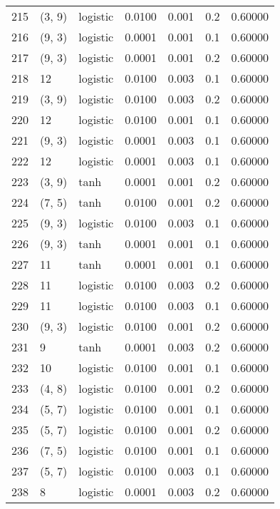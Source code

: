 \begin{tabular}{lllrrrr}
215 &      (3, 9) &  logistic &  0.0100 &  0.001 &  0.2 &   0.60000 \\
216 &      (9, 3) &  logistic &  0.0001 &  0.001 &  0.1 &   0.60000 \\
217 &      (9, 3) &  logistic &  0.0001 &  0.001 &  0.2 &   0.60000 \\
218 &          12 &  logistic &  0.0100 &  0.003 &  0.1 &   0.60000 \\
219 &      (3, 9) &  logistic &  0.0100 &  0.003 &  0.2 &   0.60000 \\
220 &          12 &  logistic &  0.0100 &  0.001 &  0.1 &   0.60000 \\
221 &      (9, 3) &  logistic &  0.0001 &  0.003 &  0.1 &   0.60000 \\
222 &          12 &  logistic &  0.0001 &  0.003 &  0.1 &   0.60000 \\
223 &      (3, 9) &      tanh &  0.0001 &  0.001 &  0.2 &   0.60000 \\
224 &      (7, 5) &      tanh &  0.0100 &  0.001 &  0.2 &   0.60000 \\
225 &      (9, 3) &  logistic &  0.0100 &  0.003 &  0.1 &   0.60000 \\
226 &      (9, 3) &      tanh &  0.0001 &  0.001 &  0.1 &   0.60000 \\
227 &          11 &      tanh &  0.0001 &  0.001 &  0.1 &   0.60000 \\
228 &          11 &  logistic &  0.0100 &  0.003 &  0.2 &   0.60000 \\
229 &          11 &  logistic &  0.0100 &  0.003 &  0.1 &   0.60000 \\
230 &      (9, 3) &  logistic &  0.0100 &  0.001 &  0.2 &   0.60000 \\
231 &           9 &      tanh &  0.0001 &  0.003 &  0.2 &   0.60000 \\
232 &          10 &  logistic &  0.0100 &  0.001 &  0.1 &   0.60000 \\
233 &      (4, 8) &  logistic &  0.0100 &  0.001 &  0.2 &   0.60000 \\
234 &      (5, 7) &  logistic &  0.0100 &  0.001 &  0.1 &   0.60000 \\
235 &      (5, 7) &  logistic &  0.0100 &  0.001 &  0.2 &   0.60000 \\
236 &      (7, 5) &  logistic &  0.0100 &  0.001 &  0.1 &   0.60000 \\
237 &      (5, 7) &  logistic &  0.0100 &  0.003 &  0.1 &   0.60000 \\
238 &           8 &  logistic &  0.0001 &  0.003 &  0.2 &   0.60000 \\

\end{tabular}
